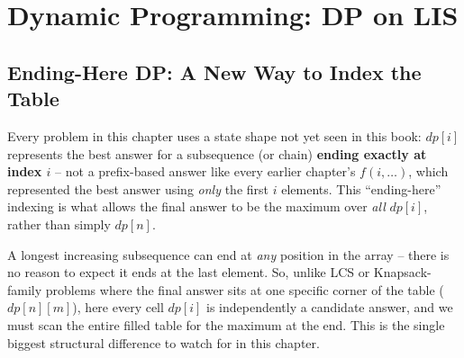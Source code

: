 \chapter{Dynamic Programming: DP on LIS}

\section{Ending-Here DP: A New Way to Index the Table}
\label{sec:dp-lis-intro}

Every problem in this chapter uses a state shape not yet seen in this
book: $\textit{dp}[i]$ represents the best answer for a subsequence (or
chain) \textbf{ending exactly at index $i$} -- not a prefix-based answer
like every earlier chapter's $f(i, \ldots)$, which represented the best
answer using \emph{only} the first $i$ elements. This ``ending-here''
indexing is what allows the final answer to be the maximum over
\emph{all} $\textit{dp}[i]$, rather than simply $\textit{dp}[n]$.

\begin{ideabox}
A longest increasing subsequence can end at \emph{any} position in the
array -- there is no reason to expect it ends at the last element. So,
unlike LCS or Knapsack-family problems where the final answer sits at
one specific corner of the table ($\textit{dp}[n][m]$), here every cell
$\textit{dp}[i]$ is independently a candidate answer, and we must scan
the entire filled table for the maximum at the end. This is the single
biggest structural difference to watch for in this chapter.
\end{ideabox}

